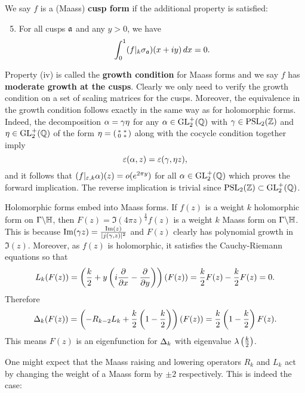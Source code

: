     We say $f$ is a (Maass) \textbf{cusp form} if the additional property is satisfied:
    \begin{enumerate}[label=(\roman*)]
      \setcounter{enumi}{4}
      \item For all cusps $\mathfrak{a}$ and any $y > 0$, we have
      \[
        \int_{0}^{1}(f|_{k}\sigma_{\mathfrak{a}})(x+iy)\,dx = 0.
      \]
    \end{enumerate}
    Property (iv) is called the \textbf{growth condition} for Maass forms and we say $f$ has \textbf{moderate growth at the cusps}. Clearly we only need to verify the growth condition on a set of scaling matrices for the cusps. Moreover, the equivalence in the growth condition follows exactly in the same way as for holomorphic forms. Indeed, the decomposition $\alpha = \gamma\eta$ for any $\alpha \in \mathrm{GL}_{2}^{+}(\mathbb{Q})$ with $\gamma \in \mathrm{PSL}_{2}(\mathbb{Z})$ and $\eta \in \mathrm{GL}_{2}^{+}(\mathbb{Q})$ of the form $\eta = \begin{psmallmatrix} \ast & \ast \\ 0 & \ast \end{psmallmatrix}$ along with the cocycle condition together imply
    \[
      \varepsilon(\alpha,z) = \varepsilon(\gamma,\eta z),
    \]
    and it follows that $(f|_{\varepsilon,k}\alpha)(z) = o(e^{2\pi y})$ for all $\alpha \in \mathrm{GL}_{2}^{+}(\mathbb{Q})$ which proves the forward implication. The reverse implication is trivial since $\mathrm{PSL}_{2}(\mathbb{Z}) \subset \mathrm{GL}_{2}^{+}(\mathbb{Q})$. 

    \begin{remark}\label{rem:holomorphic_embedds_into_Maass}
      Holomorphic forms embed into Maass forms. If $f(z)$ is a weight $k$ holomorphic form on $\Gamma\backslash\mathbb{H}$, then $F(z) = \Im(4\pi z)^{\frac{k}{2}}f(z)$ is a weight $k$ Maass form on $\Gamma\backslash\mathbb{H}$. This is because $\mathrm{Im}(\gamma z) = \frac{\mathrm{Im}(z)}{|j(\gamma,z)|^{2}}$ and $F(z)$ clearly has polynomial growth in $\Im(z)$. Moreover, as $f(z)$ is holomorphic, it satisfies the Cauchy-Riemann equations so that
      \[
        L_{k}(F(z)) = \left(\frac{k}{2}+y\left(i\frac{\partial}{\partial x}-\frac{\partial}{\partial y}\right)\right)(F(z)) = \frac{k}{2}F(z)-\frac{k}{2}F(z) = 0.
      \]
      Therefore
      \[
        \Delta_{k}(F(z)) = \left(-R_{k-2}L_{k}+\frac{k}{2}\left(1-\frac{k}{2}\right)\right)(F(z)) = \frac{k}{2}\left(1-\frac{k}{2}\right)F(z).
      \]
      This means $F(z)$ is an eigenfunction for $\Delta_{k}$ with eigenvalue $\lambda\left(\frac{k}{2}\right)$.
    \end{remark}

    One might expect that the Maass raising and lowering operators $R_{k}$ and $L_{k}$ act by changing the weight of a Maass form by $\pm 2$ respectively. This is indeed the case:

